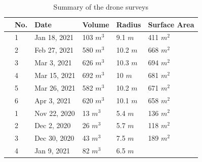 \documentclass[utf8]{frontiersSCNS}
\begin{document}
\begin{table}
	\centering
	\caption{ Summary of the drone surveys}
	\label{tab:uav}
	\begin{tabular}{@{}|llllll|@{}}
		\toprule
		\textbf{}              & \textbf{No.} & \textbf{Date} & \textbf{Volume} & \textbf{Radius} & \textbf{Surface Area} \\ \midrule
		\multicolumn{1}{|l|}{\multirow{6}{*}{\rotatebox[origin=c]{90}{IN21}}}
		                       & 1            & Jan 18, 2021  & 103 $m^{3}$     & 9.1 $m$
		                       & 411 $m^{2}$                                                                      \\
		\multicolumn{1}{|l|}{} & 2            & Feb 27, 2021  & 580 $m^{3}$     & 10.2 $m$
		                       & 668 $m^{2}$                                                                      \\
		\multicolumn{1}{|l|}{} & 3            & Mar 3, 2021   & 626 $m^{3}$     & 10.3 $m$
		                       & 694 $m^{2}$                                                                      \\
		\multicolumn{1}{|l|}{} & 4            & Mar 15, 2021  & 692 $m^{3}$     & 10 $m$
		                       & 681 $m^{2}$                                                                      \\
		\multicolumn{1}{|l|}{} & 5            & Mar 26, 2021  & 582 $m^{3}$     & 10.2 $m$
		                       & 671 $m^{2}$                                                                      \\
		\multicolumn{1}{|l|}{} & 6            & Apr 3, 2021   & 620 $m^{3}$     & 10.1 $m$
		                       & 658 $m^{2}$
		\\\midrule
		\multicolumn{1}{|l|}{\multirow{8}{*}{\rotatebox[origin=c]{90}{CH21}}}
		                       & 1            & Nov 22, 2020  & 13 $m^{3}$      & 5.4 $m$
		                       & 136 $m^{2}$                                                                       \\
		\multicolumn{1}{|l|}{} & 2            & Dec 2, 2020   & 26 $m^{3}$      & 5.7 $m$
		                       & 118 $m^{2}$                                                                       \\
		\multicolumn{1}{|l|}{} & 3            & Dec 30, 2020  & 43 $m^{3}$      & 7.5 $m$
		                       & 189 $m^{2}$                                                                       \\
		\multicolumn{1}{|l|}{} & 4            & Jan 9, 2021   & 82 $m^{3}$      & 6.5 $m$

\end{tabular}
\end{table}
\end{document}
